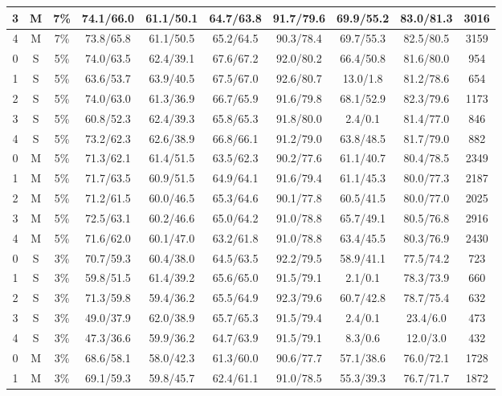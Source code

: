 \begin{table*}
\begin{tabular}{|c|c|c||c|c|c|c|c|c||c|}
3 & M & 7\% & 74.1/66.0 & 61.1/50.1 & 64.7/63.8 & 91.7/79.6 & 69.9/55.2 & 83.0/81.3 & 3016 \\ \hline
4 & M & 7\% & 73.8/65.8 & 61.1/50.5 & 65.2/64.5 & 90.3/78.4 & 69.7/55.3 & 82.5/80.5 & 3159 \\ \hline
0 & S & 5\% & 74.0/63.5 & 62.4/39.1 & 67.6/67.2 & 92.0/80.2 & 66.4/50.8 & 81.6/80.0 & 954 \\ \hline
1 & S & 5\% & 63.6/53.7 & 63.9/40.5 & 67.5/67.0 & 92.6/80.7 & 13.0/1.8 & 81.2/78.6 & 654 \\ \hline
2 & S & 5\% & 74.0/63.0 & 61.3/36.9 & 66.7/65.9 & 91.6/79.8 & 68.1/52.9 & 82.3/79.6 & 1173 \\ \hline
3 & S & 5\% & 60.8/52.3 & 62.4/39.3 & 65.8/65.3 & 91.8/80.0 & 2.4/0.1 & 81.4/77.0 & 846 \\ \hline
4 & S & 5\% & 73.2/62.3 & 62.6/38.9 & 66.8/66.1 & 91.2/79.0 & 63.8/48.5 & 81.7/79.0 & 882 \\ \hline
0 & M & 5\% & 71.3/62.1 & 61.4/51.5 & 63.5/62.3 & 90.2/77.6 & 61.1/40.7 & 80.4/78.5 & 2349 \\ \hline
1 & M & 5\% & 71.7/63.5 & 60.9/51.5 & 64.9/64.1 & 91.6/79.4 & 61.1/45.3 & 80.0/77.3 & 2187 \\ \hline
2 & M & 5\% & 71.2/61.5 & 60.0/46.5 & 65.3/64.6 & 90.1/77.8 & 60.5/41.5 & 80.0/77.0 & 2025 \\ \hline
3 & M & 5\% & 72.5/63.1 & 60.2/46.6 & 65.0/64.2 & 91.0/78.8 & 65.7/49.1 & 80.5/76.8 & 2916 \\ \hline
4 & M & 5\% & 71.6/62.0 & 60.1/47.0 & 63.2/61.8 & 91.0/78.8 & 63.4/45.5 & 80.3/76.9 & 2430 \\ \hline
0 & S & 3\% & 70.7/59.3 & 60.4/38.0 & 64.5/63.5 & 92.2/79.5 & 58.9/41.1 & 77.5/74.2 & 723 \\ \hline
1 & S & 3\% & 59.8/51.5 & 61.4/39.2 & 65.6/65.0 & 91.5/79.1 & 2.1/0.1 & 78.3/73.9 & 660 \\ \hline
2 & S & 3\% & 71.3/59.8 & 59.4/36.2 & 65.5/64.9 & 92.3/79.6 & 60.7/42.8 & 78.7/75.4 & 632 \\ \hline
3 & S & 3\% & 49.0/37.9 & 62.0/38.9 & 65.7/65.3 & 91.5/79.4 & 2.4/0.1 & 23.4/6.0 & 473 \\ \hline
4 & S & 3\% & 47.3/36.6 & 59.9/36.2 & 64.7/63.9 & 91.5/79.1 & 8.3/0.6 & 12.0/3.0 & 432 \\ \hline
0 & M & 3\% & 68.6/58.1 & 58.0/42.3 & 61.3/60.0 & 90.6/77.7 & 57.1/38.6 & 76.0/72.1 & 1728 \\ \hline
1 & M & 3\% & 69.1/59.3 & 59.8/45.7 & 62.4/61.1 & 91.0/78.5 & 55.3/39.3 & 76.7/71.7 & 1872 \\ \hline

\end{tabular}
\end{table*}
